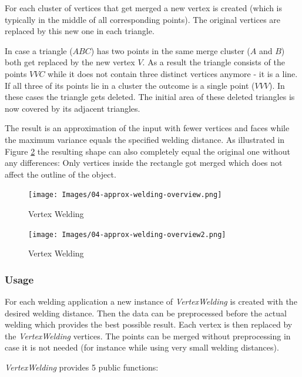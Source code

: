 \documentclass[../ClassicThesis.tex]{subfiles}
\begin{document}
For each cluster of vertices that get merged a new vertex is created (which is typically in the middle of all corresponding points). The original vertices are replaced by this new one in each triangle.

In case a triangle ($ABC$) has two points in the same merge cluster ($A$ and $B$) both get replaced by the new vertex $V$. As a result the triangle consists of the points $VVC$ while it does not contain three distinct vertices anymore - it is a line. If all three of its points lie in a cluster the outcome is a single point ($VVV$). In these cases the triangle gets deleted. The initial area of these deleted triangles is now covered by its adjacent triangles.

The result is an approximation of the input with fewer vertices and faces while the maximum variance equals the specified welding distance. As illustrated in Figure \ref{fig:vertex_welding} the resulting shape can also completely equal the original one without any differences: Only vertices inside the rectangle got merged which does not affect the outline of the object.


\begin{figure}
\texttt{[image: Images/04-approx-welding-overview.png]}
% 
\caption{Vertex Welding}
\label{fig:vertex_welding}
\end{figure}

\begin{figure}
\texttt{[image: Images/04-approx-welding-overview2.png]}
\caption{Vertex Welding}
\label{fig:vertex_welding}
\end{figure}

\subsubsection{Usage}

For each welding application a new instance of \emph{VertexWelding} is created with the desired welding distance. Then the data can be preprocessed before the actual welding which provides the best possible result. Each vertex is then replaced by the \emph{VertexWelding} vertices. The points can be merged without preprocessing in case it is not needed (for instance while using very small welding distances). 

\emph{VertexWelding} provides 5 public functions:


\end{document}
